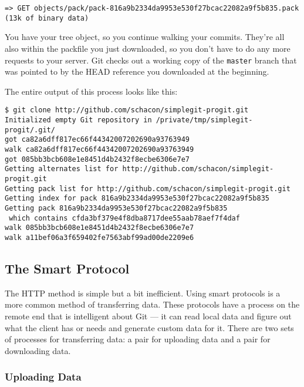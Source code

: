 \documentclass[a4paper]{book}
\begin{document}
\begin{shaded}\begin{verbatim}
=> GET objects/pack/pack-816a9b2334da9953e530f27bcac22082a9f5b835.pack
(13k of binary data)
\end{verbatim}\end{shaded}

You have your tree object, so you continue walking your commits. They're all also within the packfile you just downloaded, so you don't have to do any more requests to your server. Git checks out a working copy of the \texttt{master} branch that was pointed to by the HEAD reference you downloaded at the beginning.

The entire output of this process looks like this:

\begin{shaded}\begin{verbatim}
$ git clone http://github.com/schacon/simplegit-progit.git
Initialized empty Git repository in /private/tmp/simplegit-progit/.git/
got ca82a6dff817ec66f44342007202690a93763949
walk ca82a6dff817ec66f44342007202690a93763949
got 085bb3bcb608e1e8451d4b2432f8ecbe6306e7e7
Getting alternates list for http://github.com/schacon/simplegit-progit.git
Getting pack list for http://github.com/schacon/simplegit-progit.git
Getting index for pack 816a9b2334da9953e530f27bcac22082a9f5b835
Getting pack 816a9b2334da9953e530f27bcac22082a9f5b835
 which contains cfda3bf379e4f8dba8717dee55aab78aef7f4daf
walk 085bb3bcb608e1e8451d4b2432f8ecbe6306e7e7
walk a11bef06a3f659402fe7563abf99ad00de2209e6
\end{verbatim}\end{shaded}

\subsection{The Smart Protocol}\label{the-smart-protocol}

The HTTP method is simple but a bit inefficient. Using smart protocols is a more common method of transferring data. These protocols have a process on the remote end that is intelligent about Git --- it can read local data and figure out what the client has or needs and generate custom data for it. There are two sets of processes for transferring data: a pair for uploading data and a pair for downloading data.

\subsubsection{Uploading Data}
\end{document}
